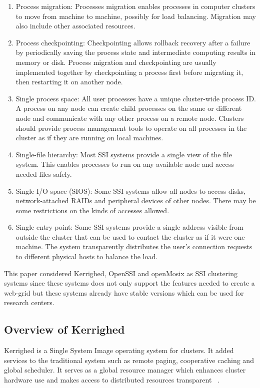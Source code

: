 \documentclass[preprint]{acm_proc_article-sp}
\begin{document}
\begin{enumerate}
	\item Process migration: Processes migration enables processes in computer clusters to move from machine to machine, possibly for load balancing. Migration may also include other associated resources.
	\item Process checkpointing: Checkpointing allows rollback recovery after a failure by periodically saving the process state and intermediate computing results in memory or disk. Process migration and checkpointing are usually implemented together by checkpointing a process first before migrating it, then restarting it on another node.
	\item Single process space: All user processes have a unique cluster-wide process ID. A process on any node can create child processes on the same or different node and communicate with any other process on a remote node. Clusters should provide process management tools to operate on all processes in the cluster as if they are running on local machines.
	\item Single-file hierarchy: Most SSI systems provide a single view of the file system. This enables processes to run on any available node and access needed files safely.
	\item Single I/O space (SIOS): Some SSI systems allow all nodes to access disks, network-attached RAIDs and peripheral devices of other nodes. There may be some restrictions on the kinds of accesses allowed.
	\item Single entry point: Some SSI systems provide a single address visible from outside the cluster that can be used to contact the cluster as if it were one machine. The system transparently distributes the user's connection requests to different physical hosts to balance the load.
\end{enumerate}

This paper considered Kerrighed, OpenSSI and openMosix as SSI clustering systems since these systems does not only support the features needed to create a web-grid but these systems already have stable versions which can be used for research centers.

\subsection{Overview of Kerrighed}

Kerrighed is a Single System Image operating system for clusters. It added services to the traditional system such as remote paging, cooperative caching and global scheduler. It serves as a global resource manager which enhances cluster hardware use and makes access to distributed resources transparent ~\citep{vallee10}.
\end{document}
